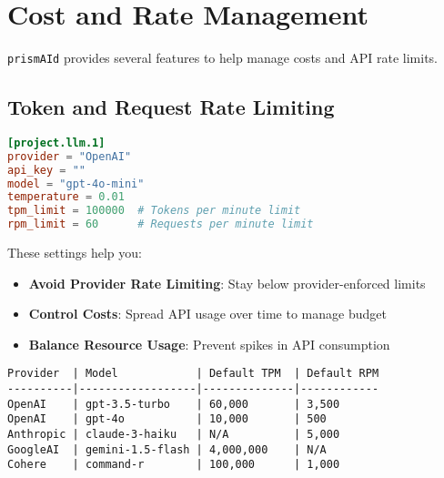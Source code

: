 
\section{Cost and Rate Management}

\texttt{prismAId} provides several features to help manage costs and API rate limits.

\subsection{Token and Request Rate Limiting}

\begin{configbox}
\begin{lstlisting}[language=TOML]
[project.llm.1]
provider = "OpenAI"
api_key = ""
model = "gpt-4o-mini"
temperature = 0.01
tpm_limit = 100000  # Tokens per minute limit
rpm_limit = 60      # Requests per minute limit
\end{lstlisting}
\end{configbox}

These settings help you:
\begin{itemize}
    \item \textbf{Avoid Provider Rate Limiting}: Stay below provider-enforced limits
    \item \textbf{Control Costs}: Spread API usage over time to manage budget
    \item \textbf{Balance Resource Usage}: Prevent spikes in API consumption
\end{itemize}


\begin{commandbox}
\begin{lstlisting}
Provider  | Model            | Default TPM  | Default RPM
----------|------------------|--------------|------------
OpenAI    | gpt-3.5-turbo    | 60,000       | 3,500
OpenAI    | gpt-4o           | 10,000       | 500
Anthropic | claude-3-haiku   | N/A          | 5,000
GoogleAI  | gemini-1.5-flash | 4,000,000    | N/A
Cohere    | command-r        | 100,000      | 1,000
\end{lstlisting}
\end{commandbox}

